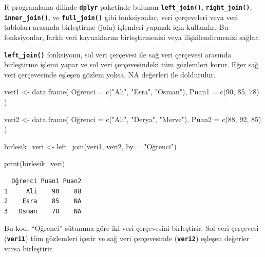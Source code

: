 \documentclass[
  letterpaper,
  DIV=11,
  numbers=noendperiod]{scrreprt}
\newenvironment{Shaded}{\begin{snugshade}}{\end{snugshade}}
\newcommand{\AttributeTok}[1]{\textcolor[rgb]{0.40,0.45,0.13}{#1}}
\newcommand{\DecValTok}[1]{\textcolor[rgb]{0.68,0.00,0.00}{#1}}
\newcommand{\FunctionTok}[1]{\textcolor[rgb]{0.28,0.35,0.67}{#1}}
\newcommand{\NormalTok}[1]{\textcolor[rgb]{0.00,0.23,0.31}{#1}}
\newcommand{\OtherTok}[1]{\textcolor[rgb]{0.00,0.23,0.31}{#1}}
\newcommand{\StringTok}[1]{\textcolor[rgb]{0.13,0.47,0.30}{#1}}
\begin{document}
R programlama dilinde \textbf{\texttt{dplyr}} paketinde bulunan
\textbf{\texttt{left\_join()}}, \textbf{\texttt{right\_join()}},
\textbf{\texttt{inner\_join()}}, ve \textbf{\texttt{full\_join()}} gibi
fonksiyonlar, veri çerçeveleri veya veri tabloları arasında birleştirme
(join) işlemleri yapmak için kullanılır. Bu fonksiyonlar, farklı veri
kaynaklarını birleştirmenizi veya ilişkilendirmenizi sağlar.

\textbf{\texttt{left\_join()}} fonksiyonu, sol veri çerçevesi ile sağ
veri çerçevesi arasında birleştirme işlemi yapar ve sol veri
çerçevesindeki tüm gözlemleri korur. Eğer sağ veri çerçevesinde eşleşen
gözlem yoksa, NA değerleri ile doldurulur.

\begin{Shaded}
\begin{Highlighting}[]
\NormalTok{veri1 }\OtherTok{\textless{}{-}} \FunctionTok{data.frame}\NormalTok{(}
\NormalTok{  Oğrenci }\OtherTok{=} \FunctionTok{c}\NormalTok{(}\StringTok{"Ali"}\NormalTok{, }\StringTok{"Esra"}\NormalTok{, }\StringTok{"Osman"}\NormalTok{),}
  \AttributeTok{Puan1 =} \FunctionTok{c}\NormalTok{(}\DecValTok{90}\NormalTok{, }\DecValTok{85}\NormalTok{, }\DecValTok{78}\NormalTok{)}
\NormalTok{)}

\NormalTok{veri2 }\OtherTok{\textless{}{-}} \FunctionTok{data.frame}\NormalTok{(}
\NormalTok{  Oğrenci }\OtherTok{=} \FunctionTok{c}\NormalTok{(}\StringTok{"Ali"}\NormalTok{, }\StringTok{"Derya"}\NormalTok{, }\StringTok{"Merve"}\NormalTok{),}
  \AttributeTok{Puan2 =} \FunctionTok{c}\NormalTok{(}\DecValTok{88}\NormalTok{, }\DecValTok{92}\NormalTok{, }\DecValTok{85}\NormalTok{)}
\NormalTok{)}

\NormalTok{birlesik\_veri }\OtherTok{\textless{}{-}} \FunctionTok{left\_join}\NormalTok{(veri1, veri2, }\AttributeTok{by =} \StringTok{"Oğrenci"}\NormalTok{)}

\FunctionTok{print}\NormalTok{(birlesik\_veri)}
\end{Highlighting}
\end{Shaded}

\begin{verbatim}
  Oğrenci Puan1 Puan2
1     Ali    90    88
2    Esra    85    NA
3   Osman    78    NA
\end{verbatim}

Bu kod, ``Öğrenci'' sütununa göre iki veri çerçevesini birleştirir. Sol
veri çerçevesi (\textbf{\texttt{veri1}}) tüm gözlemleri içerir ve sağ
veri çerçevesinde (\textbf{\texttt{veri2}}) eşleşen değerler varsa
birleştirir.
\end{document}
